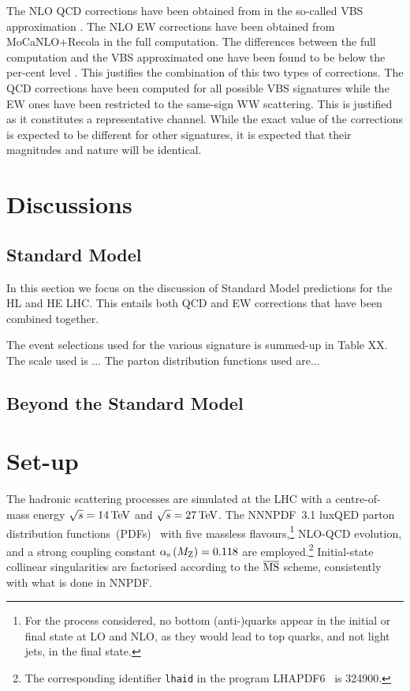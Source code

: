 \documentclass[11pt,epsf]{article}
\newcommand{\MP}[1]{{ {\color{blue}{ [MP: #1]}} }}
\begin{document}
The NLO QCD corrections have been obtained from \cite{Arnold:2008rz, Arnold:2011wj, Baglio:2014uba} in the so-called VBS approximation \cite{Ballestrero:2018anz}.
The NLO EW corrections have been obtained from MoCaNLO+Recola \cite{Actis:2016mpe,Actis:2016mpe} in the full computation.
The differences between the full computation and the VBS approximated one have been found to be below the per-cent level \cite{Ballestrero:2018anz}.
This justifies the combination of this two types of corrections.
The QCD corrections have been computed for all possible VBS signatures while the EW ones have been restricted to the same-sign WW scattering.
This is justified as it constitutes a representative channel.
While the exact value of the corrections is expected to be different for other signatures, it is expected that their magnitudes and nature will be identical.

\section{Discussions}

\subsection{Standard Model}

In this section we focus on the discussion of Standard Model predictions for the HL and HE LHC.
This entails both QCD and EW corrections that have been combined together.

The event selections used for the various signature is summed-up in Table XX.
The scale used is ...
The parton distribution functions used are...

\subsection{Beyond the Standard Model}

\MP{I left the set-up section for completeness but we should probably omit it in the final version}
\section{Set-up}

The hadronic scattering processes are simulated at the LHC with a centre-of-mass energy $\sqrt s = 14 \,\text{TeV}$ and $\sqrt s = 27 \,\text{TeV}$.
    The NNNPDF~3.1 luxQED parton distribution functions~(PDFs)~\cite{Bertone:2017bme} with five massless flavours,\footnote{For the process considered, no bottom (anti-)quarks appear in the initial or final state at LO and NLO, as they would lead to top quarks, and not light jets, in the final state.} 
    NLO-QCD evolution, and a strong coupling constant $\alpha_\text{s}\left( M_\text{Z} \right) = 0.118$ are employed.\footnote{The corresponding identifier {\tt lhaid} in the program LHAPDF6~\cite{Buckley:2014ana} is 324900.}
    Initial-state collinear singularities are factorised according to the ${\overline{\rm MS}}$ scheme, consistently with what is done in NNPDF.
\end{document}
